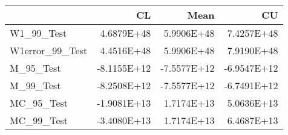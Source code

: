 \begin{tabular}{lrrr}
\toprule
{} &          CL &        Mean &          CU \\
\midrule
W1\_99\_Test      &  4.6879E+48 &  5.9906E+48 &  7.4257E+48 \\
W1error\_99\_Test &  4.4516E+48 &  5.9906E+48 &  7.9190E+48 \\
M\_95\_Test       & -8.1155E+12 & -7.5577E+12 & -6.9547E+12 \\
M\_99\_Test       & -8.2508E+12 & -7.5577E+12 & -6.7491E+12 \\
MC\_95\_Test      & -1.9081E+13 &  1.7174E+13 &  5.0636E+13 \\
MC\_99\_Test      & -3.4080E+13 &  1.7174E+13 &  6.4687E+13 \\
\bottomrule
\end{tabular}
